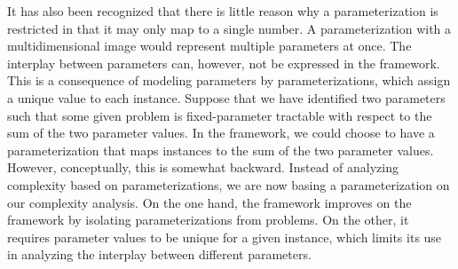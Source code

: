 It has also been recognized that there is little reason why a parameterization is restricted in that it may only map to a single number.
A parameterization with a multidimensional image would represent multiple parameters at once.
The interplay between parameters can, however, not be expressed in the \citeauthor{flum2006parameterized} framework.
This is a consequence of modeling parameters by parameterizations, which assign a unique value to each instance.
Suppose that we have identified two parameters such that some given problem is fixed-parameter tractable with respect to the sum of the two parameter values.
In the \citeauthor{flum2006parameterized} framework, we could choose to have a parameterization that maps instances to the sum of the two parameter values.
However, conceptually, this is somewhat backward.
Instead of analyzing complexity based on parameterizations, we are now basing a parameterization on our complexity analysis.
On the one hand, the \citeauthor{flum2006parameterized} framework improves on the \citeauthor{downey1999parameterized} framework by isolating parameterizations from problems.
On the other, it requires parameter values to be unique for a given instance, which limits its use in analyzing the interplay between different parameters.
